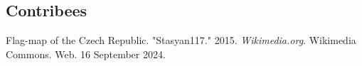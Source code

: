 \documentclass[12pt, oneside]{article}
\begin{document}
\subsection{Contribees}


%
%

\begin{thebibliography}{e}
Flag-map of the Czech Republic. "Stasyan117." 2015. \textit{Wikimedia.org}. Wikimedia Commons. Web. 16 September 2024.


\end{thebibliography}
\end{document}
